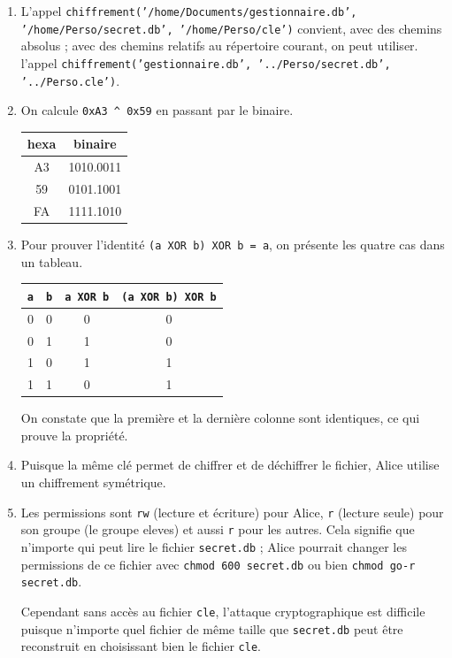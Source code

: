 \documentclass[11pt,a4paper]{article}
\newcommand{\mip}[1]{\texttt{#1}}
\newcommand{\mib}[1]{\texttt{#1}}
\begin{document}
\begin{enumerate}[resume]
\item L'appel \mip{chiffrement('/home/Documents/gestionnaire.db', '/home/Perso/secret.db', '/home/Perso/cle')} convient, avec des chemins absolus ; avec des chemins relatifs au répertoire courant, on peut utiliser.
l'appel \mip{chiffrement('gestionnaire.db', '../Perso/secret.db', '../Perso.cle')}.


\item On calcule \mip{0xA3 ^ 0x59} en passant par le binaire.


\begin{center}
\begin{tabular}{|c|c|}
\hline
hexa & binaire \\
\hline
A3& 1010.0011\\
\hline
59& 0101.1001\\
\hline
FA&1111.1010\\
\hline
\end{tabular}
\end{center}

\item Pour prouver l'identité \mip{(a XOR b) XOR b = a}, on présente les quatre cas dans un tableau.

\begin{center}
\begin{tabular}{|c|c|c|c|}
\hline
\mip{a}&\mip{b}&\mip{a XOR b}& \mip{(a XOR b) XOR b}\\
\hline
0&0&0&0\\
\hline
0&1&1&0\\
\hline
1&0&1&1\\
\hline
1&1&0&1\\
\hline
\end{tabular}
\end{center}

On constate que la première et la dernière colonne sont identiques, ce qui prouve la propriété.
\item Puisque la même clé permet de chiffrer et de déchiffrer le fichier, Alice utilise un chiffrement symétrique.

\item Les permissions sont \mib{rw} (lecture et écriture) pour Alice, \mib{r} (lecture seule) pour son groupe (le groupe eleves) et aussi \mib{r} pour les autres. Cela signifie que n'importe qui peut lire le fichier \mib{secret.db} ; Alice pourrait changer les permissions de ce fichier avec \mib{chmod 600 secret.db} ou bien  \mib{chmod go-r secret.db}.

Cependant sans accès au fichier \mib{cle}, l'attaque cryptographique est difficile puisque n'importe quel fichier de même taille que \mib{secret.db} peut être reconstruit en choisissant bien le fichier \mib{cle}.
\end{enumerate}
\end{document}
